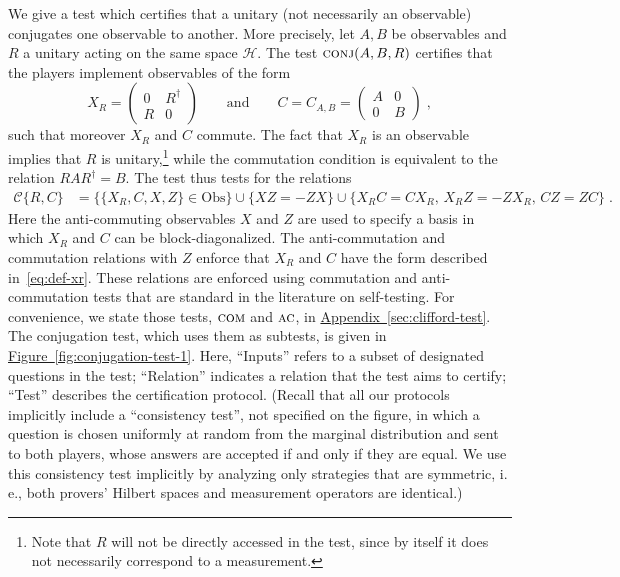 \documentclass[11pt]{article}
\numberwithin{equation}{section}
\theoremstyle{definition}
\theoremstyle{plain}
\newcommand{\ie}{i.\,e.}
\newcommand{\expref}[2]{\hyperref[#2]{#1~\ref{#2}}}
\newcommand{\setft}[1]{\mathrm{#1}}
\newcommand{\Obs}{\setft{Obs}}
\newcommand{\mH}{\mathcal{H}}
\newcommand{\conj}{\textsc{conj}}
\newcommand{\comt}{\textsc{com}}
\newcommand{\act}{\textsc{ac}}
\begin{document}
We give a test which certifies that a unitary (not necessarily an observable) conjugates one observable to another. More precisely, let $A,B$ be observables and $R$ a unitary acting on the same space $\mH$. The test $\conj(A,B,R)$ certifies that the players implement observables of the form
\begin{equation}\label{eq:def-xr}
X_R = \begin{pmatrix} 0 & R^\dagger\\ R & 0 \end{pmatrix}\qquad \text{and}\qquad C = C_{A,B} = \begin{pmatrix} A & 0\\ 0 & B \end{pmatrix}\;,
\end{equation}
such that moreover $X_R$ and $C$ commute. The fact that $X_R$ is an observable implies that $R$ is unitary,\footnote{Note that $R$ will not be directly accessed in the test, since by itself it does not necessarily correspond to a measurement.} while the commutation condition is equivalent to the relation $RAR^\dagger = B$. The test thus tests for the relations
\begin{align*}
 \mathcal{C}\{R,C\} &= \big\{ \{X_R,C,X,Z\}\in \Obs\big\} \cup \big\{XZ=-ZX\big\}
\cup \big\{ X_R C = C X_R,\, X_RZ=-Z X_R,\, C Z=ZC\big\}\;.
\end{align*}
Here the anti-commuting observables $X$ and $Z$ are used to specify a basis in which $X_R$ and $C$ can be block-diagonalized. The anti-commutation and commutation relations with $Z$ enforce that $X_R$ and $C$ have the form described in~\eqref{eq:def-xr}.
These relations are enforced using commutation and anti-commutation tests that are standard in the literature on self-testing. For convenience, we state those tests, $\comt$ and $\act$, in \expref{Appendix}{sec:clifford-test}. The conjugation test, which uses them as subtests, is given in \expref{Figure}{fig:conjugation-test-1}. Here, ``Inputs'' refers to a subset of designated questions in the test; ``Relation'' indicates a relation that the test aims to certify; ``Test'' describes the certification protocol. (Recall that all our protocols implicitly include a ``consistency test'', not specified on the figure, in which a question is chosen uniformly at random from the marginal distribution and sent to both players, whose answers are accepted if and only if they are equal. We use this consistency test implicitly by analyzing only strategies that are symmetric, \ie, both provers' Hilbert spaces and measurement operators are identical.)
\end{document}
